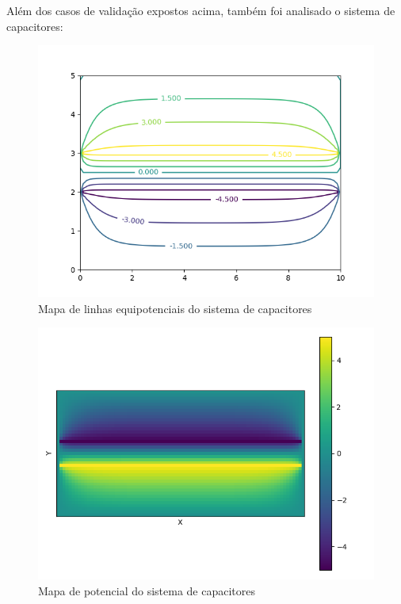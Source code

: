 \documentclass[oneside]{abntex2}
\begin{document}
\newpage
Além dos casos de validação expostos acima, também foi analisado o sistema de capacitores:

\begin{figure}[h!]
    \centering
    \includegraphics[scale=0.8]{imgs/cont_aprox_cap_1250.png}
    \caption{Mapa de linhas equipotenciais do sistema de capacitores}
    \label{cont_aprox_cap_1250}
\end{figure}

\begin{figure}[h!]
    \centering
    \includegraphics[scale=0.8]{imgs/hmap_aprox_cap_1250.png}
    \caption{Mapa de potencial do sistema de capacitores}
    \label{cont_aprox_cap_1250}
\end{figure}
\end{document}
